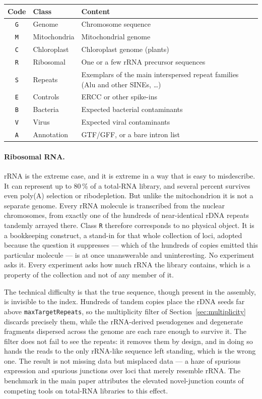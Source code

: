 \documentclass[11pt]{article}
\begin{document}
\begin{center}
\begin{tabular}{cll}
\toprule
Code & Class & Content \\
\midrule
\texttt{G} & Genome        & Chromosome sequence \\
\texttt{M} & Mitochondria  & Mitochondrial genome \\
\texttt{C} & Chloroplast   & Chloroplast genome (plants) \\
\texttt{R} & Ribosomal     & One or a few rRNA precursor sequences \\
\texttt{S} & Repeats       & Exemplars of the main interspersed repeat
                             families (Alu and other SINEs, \ldots) \\
\texttt{E} & Controls      & ERCC or other spike-ins \\
\texttt{B} & Bacteria      & Expected bacterial contaminants \\
\texttt{V} & Virus         & Expected viral contaminants \\
\texttt{A} & Annotation    & GTF/GFF, or a bare intron list \\
\bottomrule
\end{tabular}
\end{center}

\paragraph{Ribosomal RNA.}
rRNA is the extreme case, and it is extreme in a way that is easy to
misdescribe.
It can represent up to 80\,\% of a total-RNA library, and several
percent survives even poly(A) selection or ribodepletion.
But unlike the mitochondrion it is not a separate genome.
Every rRNA molecule is transcribed from the nuclear chromosomes, from
exactly one of the hundreds of near-identical rDNA repeats tandemly
arrayed there.
Class \texttt{R} therefore corresponds to no physical object.
It is a bookkeeping construct, a stand-in for that whole collection of
loci, adopted because the question it suppresses --- which of the
hundreds of copies emitted this particular molecule --- is at once
unanswerable and uninteresting.
No experiment asks it.
Every experiment asks how much rRNA the library contains, which is a
property of the collection and not of any member of it.

The technical difficulty is that the true sequence, though present in
the assembly, is invisible to the index.
Hundreds of tandem copies place the rDNA seeds far above
\texttt{maxTargetRepeats}, so the multiplicity filter of
Section~\ref{sec:multiplicity} discards precisely them, while the
rRNA-derived pseudogenes and degenerate fragments dispersed across the
genome are each rare enough to survive it.
The filter does not fail to see the repeats: it removes them by design,
and in doing so hands the reads to the only rRNA-like sequence left
standing, which is the wrong one.
The result is not missing data but misplaced data --- a haze of spurious
expression and spurious junctions over loci that merely resemble rRNA.
The benchmark in the main paper attributes the elevated novel-junction
counts of competing tools on total-RNA libraries to this effect.
\end{document}
